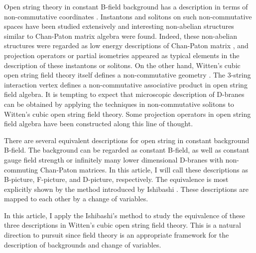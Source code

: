 \documentclass[a4paper,12pt]{article}
\begin{document}
Open string theory
in constant B-field background
has a description in terms of 
non-commutative coordinates 
\cite{Connes,Hull,Schomerus,NCSW}.
Instantons and solitons \cite{Nikita,GMS} on
such non-commutative spaces
have been studied extensively and
interesting non-abelian 
structures similar to
Chan-Paton matrix algebra were found.
Indeed, these non-abelian structures were
regarded as low energy descriptions
of Chan-Paton matrix \cite{NCsolst},
and 
projection operators
\cite{FK1,GMS} or
partial isometries
\cite{FK2,solgene}
appeared as typical elements in the 
description of these instantons or solitons.
%
On the other hand,
Witten's cubic open string field theory itself 
defines a
non-commutative geometry \cite{NCSFT}.
The 3-string interaction vertex defines 
a non-commutative associative
product in open string field algebra.
It is tempting to expect that
microscopic description of D-branes
can be obtained by applying the techniques 
in non-commutative solitons
to Witten's cubic open string field theory.
Some
projection operators
in open string field algebra
have been constructed 
\cite{RZ,KP,RSZ,Matsuo1,Matsuo2,butt,GRSZ}
along this line of thought.


There are several equivalent 
descriptions for
open string in constant background B-field.
The background can be regarded as
constant B-field,
as well as constant gauge field strength
or infinitely many lower dimensional 
D-branes with
non-commuting Chan-Paton matrices.
In this article, I will call these descriptions as
B-picture, F-picture, and D-picture,
respectively.
The equivalence is most explicitly shown
by the method introduced by Ishibashi \cite{Ish}.
These descriptions are mapped to each other
by a change of variables.

In this article, I apply
the Ishibashi's method to 
study the equivalence
of these three descriptions in
Witten's cubic open string field theory.
This is a natural direction to pursuit
since field theory is an appropriate 
framework for the description of
backgrounds and change of variables. 
\end{document}
